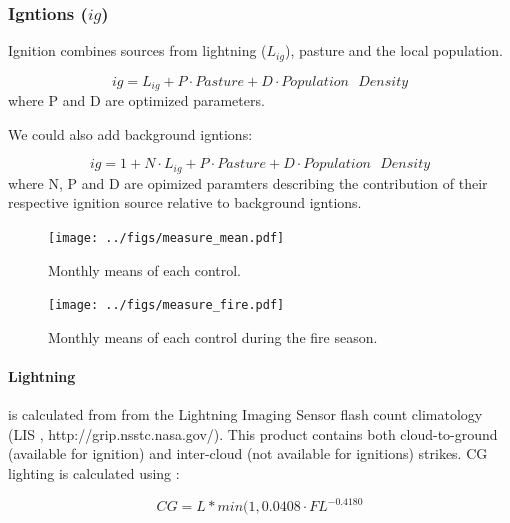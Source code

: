 \subsubsection{Igntions ($ig$)}

Ignition combines sources from lightning ($L_{ig}$), pasture and the local population.

\begin{equation}
    ig = L_{ig} + P \cdot Pasture + D \cdot Population\text{ }Density
\end{equation}
where P and D are optimized parameters.

\begin{shaded}
    We could also add background igntions:

    \begin{equation}
        ig = 1 + N \cdot L_{ig} + P \cdot Pasture + D \cdot Population\text{ }Density
    \end{equation}
    where N, P and D are opimized paramters describing the contribution of their respective ignition source relative to background igntions.
\end{shaded}


\begin{figure}[!ht]
  \centering
    \texttt{[image: ../figs/measure\_mean.pdf]}
  \caption{Monthly means of each control. }
  \label{fig:Monthly_mean_controls}
\end{figure}

\begin{figure}[!ht]
  \centering
    \texttt{[image: ../figs/measure\_fire.pdf]}
  \caption{Monthly means of each control during the fire season. }
  \label{fig:Season_mean_controls}
\end{figure}

\paragraph{Lightning}
is calculated from
from the Lightning Imaging Sensor flash count climatology (LIS \cite{christian1999lightning}, http://grip.nsstc.nasa.gov/). 
This product contains both cloud-to-ground (available for ignition) and inter-cloud (not available for ignitions) strikes.
CG lighting is calculated using \citet{kelley2014improved}:

\begin{equation}
    CG = L * min(1, 0.0408 \cdot FL^{-0.4180}
\end{equation}

